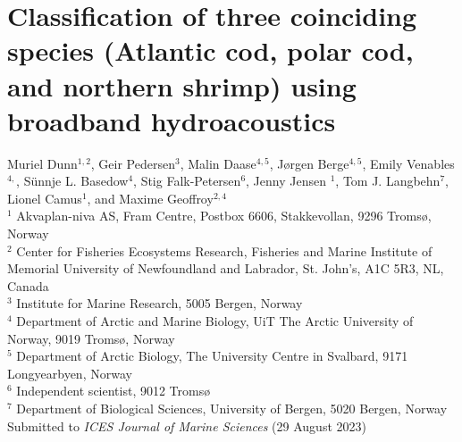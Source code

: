 \chapter{Classification of three coinciding species (Atlantic cod, polar cod, and northern shrimp) using broadband hydroacoustics}
\label{chap:classification}



Muriel Dunn$^{1,2}$, Geir Pedersen$^3$, Malin Daase$^{4,5}$, Jørgen Berge$^{4,5}$, Emily Venables$^{4,}$, S\"{u}nnje L. Basedow$^4$, Stig Falk-Petersen$^6$, Jenny Jensen $^1$, Tom J. Langbehn$^7$, Lionel Camus$^1$, and Maxime Geoffroy$^{2,4}$\\

$^1$ Akvaplan-niva AS, Fram Centre, Postbox 6606, Stakkevollan, 9296 Tromsø, Norway \\
$^2$ Center for Fisheries Ecosystems Research, Fisheries and Marine Institute of Memorial University of Newfoundland and Labrador, St. John's, A1C 5R3, NL, Canada\\
$^3$ Institute for Marine Research, 5005 Bergen, Norway\\
$^4$ Department of Arctic and Marine Biology, UiT The Arctic University of Norway, 9019 Tromsø, Norway\\
$^5$ Department of Arctic Biology, The University Centre in Svalbard, 9171 Longyearbyen, Norway \\
$^6$ Independent scientist, 9012 Tromsø\\
$^7$ Department of Biological Sciences, University of Bergen, 5020 Bergen, Norway\\



Submitted to \textit{ICES Journal of Marine Sciences} (29 August 2023) \\

